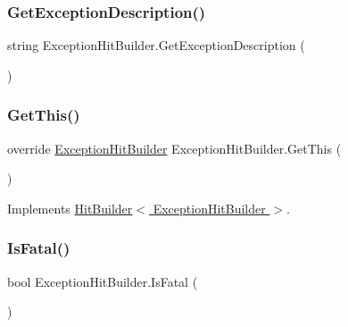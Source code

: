 \subsubsection{\texorpdfstring{Get\+Exception\+Description()}{GetExceptionDescription()}}
{\footnotesize\ttfamily string Exception\+Hit\+Builder.\+Get\+Exception\+Description (\begin{DoxyParamCaption}{ }\end{DoxyParamCaption})}

\mbox{\label{class_exception_hit_builder_ab26ba8fde304bcae22d2eab95f319677}} 
\subsubsection{\texorpdfstring{Get\+This()}{GetThis()}}
{\footnotesize\ttfamily override \hyperlink{class_exception_hit_builder}{Exception\+Hit\+Builder} Exception\+Hit\+Builder.\+Get\+This (\begin{DoxyParamCaption}{ }\end{DoxyParamCaption})\hspace{0.3cm}{\ttfamily [virtual]}}



Implements \hyperlink{class_hit_builder_a4276c57427406e264dc33f8c900ad530}{Hit\+Builder$<$ Exception\+Hit\+Builder $>$}.

\mbox{\label{class_exception_hit_builder_a599a1e4792e6b08c0a53a6b6ec9428e0}} 
\subsubsection{\texorpdfstring{Is\+Fatal()}{IsFatal()}}
{\footnotesize\ttfamily bool Exception\+Hit\+Builder.\+Is\+Fatal (\begin{DoxyParamCaption}{ }\end{DoxyParamCaption})}

\mbox{\label{class_exception_hit_builder_a846b1fe7d180d011c0cdca0903342f36}} 
